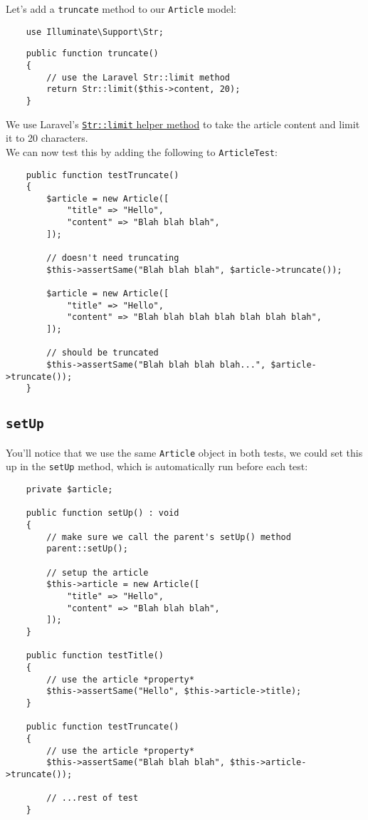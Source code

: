 Let's add a \texttt{truncate} method to our \texttt{Article} model:

\begin{verbatim}
    use Illuminate\Support\Str;
\end{verbatim}

\begin{verbatim}
    public function truncate()
    {
        // use the Laravel Str::limit method
        return Str::limit($this->content, 20);
    }
\end{verbatim}

We use Laravel's \href{http://laravel.com/docs/6.x/helpers#method-str-limit}{\texttt{Str::limit} helper method} to take the article content and limit it to 20 characters.
\\

We can now test this by adding the following to \texttt{ArticleTest}:

\begin{verbatim}
    public function testTruncate()
    {
        $article = new Article([
            "title" => "Hello",
            "content" => "Blah blah blah",
        ]);

        // doesn't need truncating
        $this->assertSame("Blah blah blah", $article->truncate());

        $article = new Article([
            "title" => "Hello",
            "content" => "Blah blah blah blah blah blah blah",
        ]);

        // should be truncated
        $this->assertSame("Blah blah blah blah...", $article->truncate());
    }
\end{verbatim}


\subsection{\texttt{setUp}}

You'll notice that we use the same \texttt{Article} object in both tests, we could set this up in the \texttt{setUp} method, which is automatically run before each test:

\begin{verbatim}
    private $article;

    public function setUp() : void
    {
        // make sure we call the parent's setUp() method
        parent::setUp();

        // setup the article
        $this->article = new Article([
            "title" => "Hello",
            "content" => "Blah blah blah",
        ]);
    }

    public function testTitle()
    {
        // use the article *property*
        $this->assertSame("Hello", $this->article->title);
    }

    public function testTruncate()
    {
        // use the article *property*
        $this->assertSame("Blah blah blah", $this->article->truncate());

        // ...rest of test
    }
\end{verbatim}


